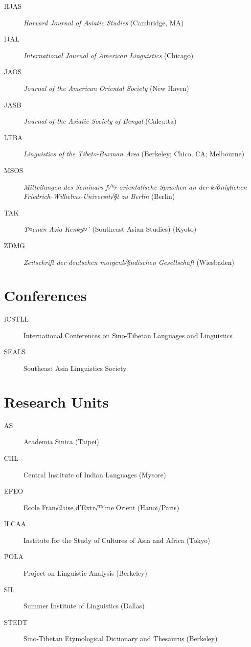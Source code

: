 \pagebreak

\begin{multicols}{2}
\begin{description}
\item[HJAS]	\textit{Harvard Journal of Asiatic Studies} (Cambridge, MA)
\item[IJAL]	\textit{International Journal of American Linguistics} (Chicago)
\item[JAOS]	\textit{Journal of the American Oriental Society} (New Haven)
\item[JASB]	\textit{Journal of the Asiatic Society of Bengal} (Calcutta)
\item[LTBA]	\textit{Linguistics of the Tibeto-Burman Area} (Berkeley; Chico, CA; Melbourne)
\columnbreak
\item[MSOS]	\textit{Mitteilungen des Seminars f√ºr orientalische Sprachen an der k√∂niglichen Friedrich-Wilhelms-Universit√§t zu Berlin} (Berlin)
\item[TAK]	\textit{T≈çnan Azia Kenky≈´} (Southeast Asian Studies) (Kyoto)
\item[ZDMG]	\textit{Zeitschrift der deutschen morgenl√§ndischen Gesellschaft} (Wiesbaden)
\end{description}
\end{multicols}

\section*{Conferences}
\begin{multicols}{2}
\begin{description}
\item[ICSTLL]	International Conferences on Sino-Tibetan Languages and Linguistics
\item[SEALS]	Southeast Asia Linguistics Society
\end{description}
\end{multicols}

\section*{Research Units}
\begin{multicols}{2}
\begin{description}
\item[AS]	Academia Sinica (Taipei)
\item[CIIL]	Central Institute of Indian Languages (Mysore)
\item[EFEO]	Ecole Fran√ßaise d'Extr√™me Orient (Hanoi/Paris)
\item[ILCAA]	Institute for the Study of Cultures of Asia and Africa (Tokyo)
\columnbreak
\item[POLA]	Project on Linguistic Analysis (Berkeley)
\item[SIL]	Summer Institute of Linguistics (\mbox{Dallas})
\item[STEDT]	Sino-Tibetan Etymological Dictionary and Thesaurus (Berkeley)
\end{description}
\end{multicols}

